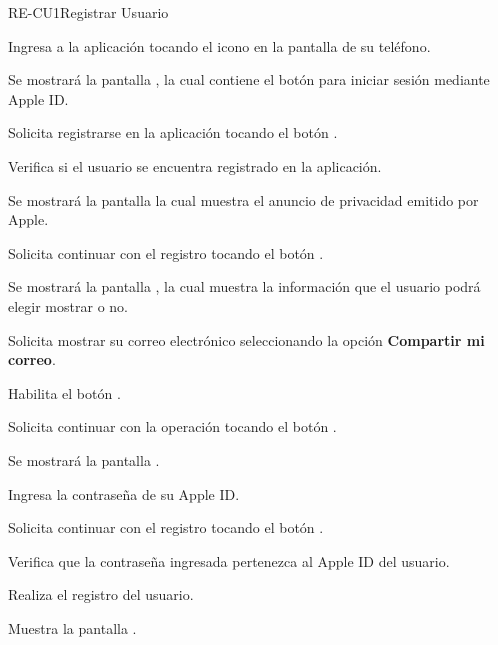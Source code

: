 \begin{UseCase}{RE-CU1}{Registrar Usuario}
{%
		}
	\end{UseCase}
	\begin{UCtrayectoria}
		\UCpaso [\UCactor] Ingresa a la aplicación tocando el icono  en la pantalla de su teléfono.
		
		\UCpaso Se mostrará la pantalla , la cual contiene el botón para iniciar sesión mediante Apple ID.
		
		\UCpaso [\UCactor] Solicita registrarse en la aplicación tocando el botón \IUBotonApple{}.
		
		\UCpaso Verifica si el usuario se encuentra registrado en la aplicación. 
		
		\UCpaso Se mostrará la pantalla  la cual muestra el anuncio de privacidad emitido por Apple.
		
		\UCpaso [\UCactor] Solicita continuar con el registro tocando el botón . 
		
		\UCpaso Se mostrará la pantalla , la cual muestra la información que el usuario podrá elegir mostrar o no.
		
		\UCpaso [\UCactor] \label{RE-CU1:Correo} Solicita mostrar su correo electrónico seleccionando la opción \textbf{Compartir mi correo}.  
		
		\UCpaso \label{RE-CU1:Boton} Habilita el botón .
		
		\UCpaso [\UCactor] Solicita continuar con la operación tocando el botón . 
		
		\UCpaso Se mostrará la pantalla .
		
		\UCpaso [\UCactor] Ingresa la contraseña de su Apple ID.
		
		\UCpaso [\UCactor] Solicita continuar con el registro tocando el botón . 
		
		\UCpaso Verifica que la contraseña ingresada pertenezca al Apple ID del usuario. 
		
		\UCpaso Realiza el registro del usuario. 
		
		\UCpaso \label{RE-CU1:PantallaZonasTuristicas} Muestra la pantalla .
	
	\end{UCtrayectoria}


